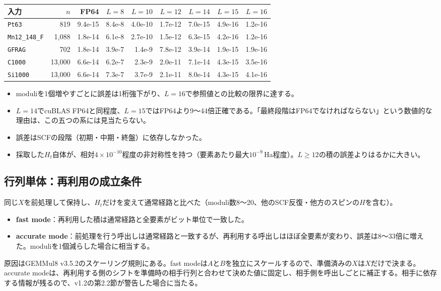 \documentclass[a4paper,11pt]{ltjsarticle}
\newcommand{\code}[1]{\texttt{#1}}
\newcommand{\E}[1]{\times10^{#1}}
\begin{document}
{\small\setlength{\tabcolsep}{4.5pt}
\noindent\begin{tabularx}{\linewidth}{@{}Yrrrrrrrr@{}}
\toprule
入力 & $n$ & FP64 & $L=8$ & $L=10$ & $L=12$ & $L=14$ & $L=15$ & $L=16$\\
\midrule
\code{Pt63} & 819 & 9.4e-15 & 8.4e-8 & 4.0e-10 & 1.7e-12 & 7.0e-15 & 4.9e-16 & 1.2e-16\\
\code{Mn12\_148\_F} & 1,088 & 1.8e-14 & 6.1e-8 & 2.7e-10 & 1.5e-12 & 6.3e-15 & 4.2e-16 & 1.2e-16\\
\code{GFRAG} & 702 & 1.8e-14 & 3.9e-7 & 1.4e-9 & 7.8e-12 & 3.9e-14 & 1.9e-15 & 1.9e-16\\
\code{C1000} & 13,000 & 6.6e-14 & 6.2e-7 & 2.3e-9 & 2.0e-11 & 7.1e-14 & 4.3e-15 & 3.5e-16\\
\code{Si1000} & 13,000 & 6.6e-14 & 7.3e-7 & 3.7e-9 & 2.1e-11 & 8.0e-14 & 4.3e-15 & 4.1e-16\\
\bottomrule
\end{tabularx}}

\medskip
\begin{itemize}
\item moduliを1個増やすごとに誤差は1桁強下がり、$L=16$で参照値との比較の限界に達する。
\item $L=14$でcuBLAS FP64と同程度、$L=15$ではFP64より9〜44倍正確である。「最終段階はFP64でなければならない」という数値的な理由は、この五つの系には見当たらない。
\item 誤差はSCFの段階（初期・中期・終盤）に依存しなかった。
\item 採取した$H_t$自体が、相対$4\E{-10}$程度の非対称性を持つ（要素あたり最大$10^{-9}$\,Ha程度）。$L\ge12$の積の誤差よりはるかに大きい。
\end{itemize}

\subsection{行列単体：再利用の成立条件}
同じ$X$を前処理して保持し、$H_t$だけを変えて通常経路と比べた（moduli数8〜20、他のSCF反復・他方のスピンの$H$を含む）。
\begin{itemize}
\item \textbf{fast mode}：再利用した積は通常経路と全要素がビット単位で一致した。
\item \textbf{accurate mode}：前処理を行う呼出しは通常経路と一致するが、再利用する呼出しはほぼ全要素が変わり、誤差は8〜33倍に増えた。moduliを1個減らした場合に相当する。
\end{itemize}
原因はGEMMul8 v3.5.2のスケーリング規則にある。fast modeは$A$と$B$を独立にスケールするので、準備済みの$X$は$X$だけで決まる。accurate modeは、再利用する側のシフトを準備時の相手行列と合わせて決めた値に固定し、相手側を呼出しごとに補正する。相手に依存する情報が残るので、v1.2の第2.2節が警告した場合に当たる。
\end{document}
